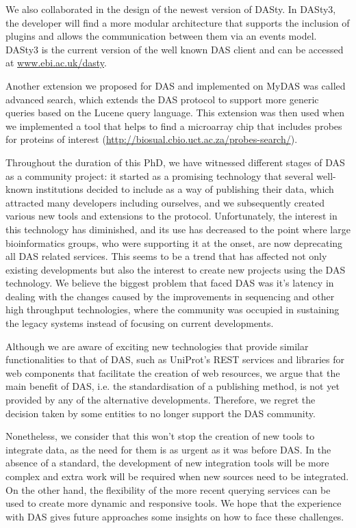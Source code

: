 We also collaborated in the design of the newest version of DASty. In DASty3, the developer will find a more modular architecture that supports the inclusion of plugins and allows the communication between them via an events model. DASty3 is the current version of the well known DAS client and can be accessed at \url{www.ebi.ac.uk/dasty}.

Another extension we proposed for DAS and implemented on MyDAS was called advanced search, which extends the DAS  protocol to support more generic queries based on the Lucene query language. This extension was then used when we implemented a tool that helps to find a microarray chip that includes probes for proteins of interest (\url{http://biosual.cbio.uct.ac.za/probes-search/}).

Throughout the duration of this PhD, we have witnessed different stages of DAS as a community project: it started as a promising technology that several well-known institutions decided to include as a way of publishing their data, which attracted many developers including ourselves, and we subsequently created various new tools and extensions to the protocol. Unfortunately, the interest in this technology has diminished, and its use has decreased to the point where large bioinformatics groups, who were supporting it at the onset, are now deprecating all DAS related services.
This seems to be a trend that has affected not only existing developments but also the interest to create new projects using the DAS technology. We believe the biggest problem that faced DAS was it’s latency in dealing with the changes caused by the improvements in sequencing and other high throughput technologies, where the community was occupied in sustaining the legacy systems instead of focusing on current developments.

Although we are aware of exciting new technologies that provide similar functionalities to that of DAS, such as UniProt's REST services and libraries for web components that facilitate the creation of web resources, we argue that the main benefit of DAS, i.e. the standardisation of a publishing method, is not yet provided by any of the alternative developments.  Therefore, we regret the decision taken by some entities to no longer support the DAS community.

Nonetheless, we consider that this won't stop the creation of new tools to integrate data, as the need for them is as urgent as it was before DAS. In the absence of a standard, the development of new integration tools will be more complex and extra work will be required when new sources need to be integrated. On the other hand, the flexibility of the more recent querying services can be used to create more dynamic and responsive tools. We hope that the experience with DAS gives future approaches some insights on how to face these challenges.

